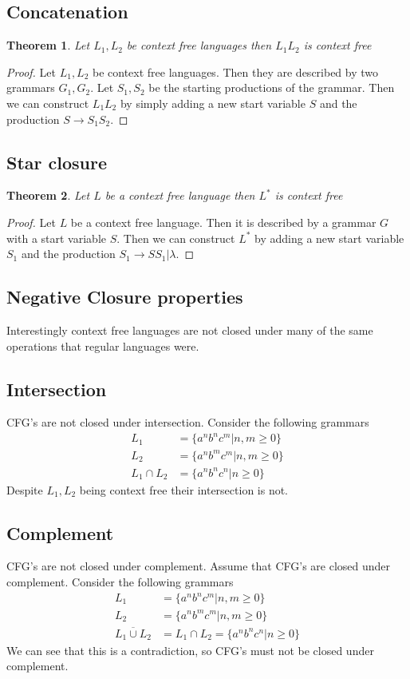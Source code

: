 \documentclass[11pt]{exam}
\newtheorem{theorem}{Theorem}[section]
\begin{document}
\subsection{Concatenation}
\begin{theorem}
Let $L_1,L_2$ be context free languages then $L_1L_2$ is context free
\end{theorem}
\begin{proof}
Let $L_1,L_2$ be context free languages. Then they are described by two grammars $G_1,G_2$. Let $S_1,S_2$ be the starting productions of the grammar. Then we can construct $L_1L_2$ by simply adding a new start variable $S$ and the production $S \rightarrow S_1S_2$.
\end{proof}


\subsection{Star closure}
\begin{theorem}
Let $L$ be a context free language then $L^*$ is context free
\end{theorem}
\begin{proof}
Let $L$ be a context free language. Then it is described by a grammar $G$ with a start variable $S$. Then we can construct $L^*$ by adding a new start variable $S_1$ and the production $S_1 \rightarrow SS_1 | \lambda$.
\end{proof}


\subsection{Negative Closure properties}
Interestingly context free languages are not closed under many of the same operations that regular languages were. 

\subsection{Intersection}
CFG's are not closed under intersection. Consider the following grammars
\begin{align*}
L_1 &= \{a^nb^nc^m | n,m \geq 0\}\\ 
L_2 &= \{a^nb^mc^m | n,m \geq 0\}\\
L_1 \cap L_2 &= \{a^nb^nc^n | n \geq 0\}
\end{align*}
Despite $L_1,L_2$ being context free their intersection is not.

\subsection{Complement}
CFG's are not closed under complement. Assume that CFG's are closed under complement. Consider the following grammars
\begin{align*}
L_1 &= \{a^nb^nc^m | n,m \geq 0\}\\ 
L_2 &= \{a^nb^mc^m | n,m \geq 0\}\\
\overline{L_1 \cup L_2} &= L_1 \cap L_2 = \{a^nb^nc^n | n \geq 0\}
\end{align*}
We can see that this is a contradiction, so CFG's must not be closed under complement.
\end{document}
